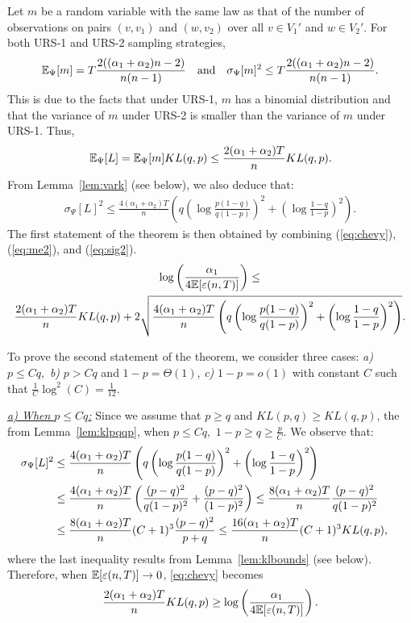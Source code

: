 Let $m$ be a random variable with the same law as that of the number
of observations on pairs $(v , v_1)$  and
  $(w,v_2) $ over all $v\in V_1'$ and $w \in V_2'$. For both URS-1 and URS-2 sampling strategies, 
$${\mathbb E}_{\Psi}[m] = T \frac{2((\alpha_1 + \alpha_2)n-2)}{n(n-1)} \quad \mbox{and}\quad
\sigma_{\Psi}[m]^2  \le T \frac{2((\alpha_1 + \alpha_2)n-2)}{n(n-1)}.$$
This is due to the facts that under URS-1, $m$ has a binomial distribution and that the variance of $m$ under URS-2 is smaller than the variance of $m$ under URS-1. Thus, 
\begin{equation}\label{eq:me2}
{\mathbb E}_{\Psi}[L] = {\mathbb E}_{\Psi}[m] KL(q,p) \le  \frac{2(\alpha_1 + \alpha_2)T}{n}KL(q,p). \end{equation}
From Lemma~\ref{lem:vark} (see below), we also deduce that:
\begin{align}\label{eq:sig2}
\sigma_{\Psi}[L]^2 \le  \frac{4(\alpha_1+\alpha_2)T}{n}\left(q\left(
    \log\frac{p(1-q)}{q(1-p)}\right)^2 + \left(
    \log\frac{1-q}{1-p}\right)^2 \right).
\end{align}
The first statement of the theorem is then obtained by combining (\ref{eq:chevy}), (\ref{eq:me2}), and (\ref{eq:sig2}).
\begin{multline}
\log \left(\frac{\alpha_1}{4 {\mathbb E} [ \varepsilon(n,T) ]} \right) \le \cr
 \frac{2(\alpha_1 + \alpha_2)T}{n}KL(q,p) + 2\sqrt{ \frac{4(\alpha_1+\alpha_2)T}{n}\left(q\left(
    \log\frac{p(1-q)}{q(1-p)}\right)^2 + \left(
    \log\frac{1-q}{1-p}\right)^2 \right)}. \label{eq:flbndna} \end{multline}

To prove the second statement of the theorem, we consider three cases: {\em a)} $p \le
Cq,$ {\em b)} $p >Cq$ and $1-p=\Theta(1)$, {\em c)} $1-p = o(1)$ with
constant $C$ such that $\frac{1}{C} \log^2(C) = \frac{1}{12}.$

\smallskip
\noindent\underline{\em  a) When $p \le Cq$:} Since we assume that $p \ge q$ and $KL(p,q)\ge KL(q,p)$, the from Lemma~\ref{lem:klpqqp}, when $p \le Cq,$ $1-p\ge q \ge \frac{p}{C}$. We observe that:
\begin{align}
\sigma_{\Psi}[L]^2 &\le  \frac{4(\alpha_1 + \alpha_2)T}{n}\left(q\left(
    \log\frac{p(1-q)}{q(1-p)}\right)^2 + \left(
    \log\frac{1-q}{1-p}\right)^2 \right) \cr
& \le  \frac{4(\alpha_1 + \alpha_2)T}{n}\left(    \frac{(p-q)^2}{q(1-p)^2} +
  \frac{(p-q)^2}{(1-p)^2} \right) \le \frac{8(\alpha_1 + \alpha_2)T}{n} \frac{(p-q)^2}{q(1-p)^2} \cr
& \le  \frac{8(\alpha_1 + \alpha_2)T}{n} (C+1)^3 \frac{(p-q)^2}{p+q}  \le \frac{16(\alpha_1 + \alpha_2)T}{n} (C+1)^3 KL(q,p),
\end{align}
where the last inequality results from Lemma~\ref{lem:klbounds} (see below). Therefore, when ${\mathbb E} [\varepsilon(n,T)]\rightarrow 0$, \eqref{eq:chevy} becomes
$$
 \frac{2(\alpha_1 + \alpha_2)T}{n}KL(q,p) \ge  \log \left(
  \frac{\alpha_1}{4 {\mathbb E} [ \varepsilon(n,T) ]} \right).
$$

